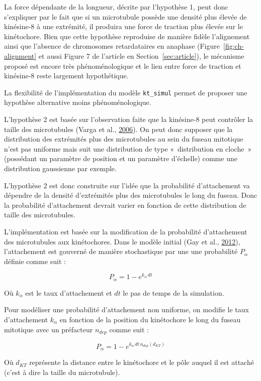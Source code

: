 \documentclass[12pt,a4paper,twoside,openright]{book}
\begin{document}
La force dépendante de la longueur, décrite par l'hypothèse 1, peut donc
s'expliquer par le fait que si un microtubule possède une densité plus
élevée de kinésine-8 à une extrémité, il produira une force de traction
plus élevée sur le kinétochore. Bien que cette hypothèse reproduise de
manière fidèle l'alignement ainsi que l'absence de chromosomes
retardataires en anaphase (Figure~\ref{fig:ch-alignment} et aussi Figure
7 de l'article en Section~\ref{sec:article}), le mécanisme proposé est
encore très phénoménologique et le lien entre force de traction et
kinésine-8 reste largement hypothétique.

La flexibilité de l'implémentation du modèle \texttt{kt\_simul} permet
de proposer une hypothèse alternative moins phénoménologique.

L'hypothèse 2 est basée sur l'observation faite que la kinésine-8 peut
contrôler la taille des microtubules (Varga et al.,
\protect\hyperlink{ref-Varga2006}{2006}). On peut donc supposer que la
distribution des extrémités plus des microtubules au sein du fuseau
mitotique n'est pas uniforme mais suit une distribution de type
«~distribution en cloche~» (possédant un paramètre de position et un
paramètre d'échelle) comme une distribution gaussienne par exemple.

L'hypothèse 2 est donc construite sur l'idée que la probabilité
d'attachement va dépendre de la densité d'extrémités plus des
microtubules le long du fuseau. Donc la probabilité d'attachement
devrait varier en fonction de cette distribution de taille des
microtubules.

L'implémentation est basée sur la modification de la probabilité
d'attachement des microtubules aux kinétochores. Dans le modèle initial
(Gay et al., \protect\hyperlink{ref-Gay2012a}{2012}), l'attachement est
gouverné de manière stochastique par une une probabilité \(P_{\alpha}\)
définie comme suit :

\[
P_{\alpha} = 1 - e^{k_{\alpha}\,dt}
\]

Où \(k_{\alpha}\) est le taux d'attachement et \(dt\) le pas de temps de
la simulation.

Pour modéliser une probabilité d'attachement non uniforme, on modifie le
taux d'attachement \(k_{\alpha}\) en fonction de la position du
kinétochore le long du fuseau mitotique avec un préfacteur \(n_{dep}\)
comme suit :

\[
P_{\alpha} = 1 - e^{k_{\alpha}\,dt\,n_{dep}(d_{KT})}
\]

Où \(d_{KT}\) représente la distance entre le kinétochore et le pôle
auquel il est attaché (c'est à dire la taille du microtubule).
\end{document}
